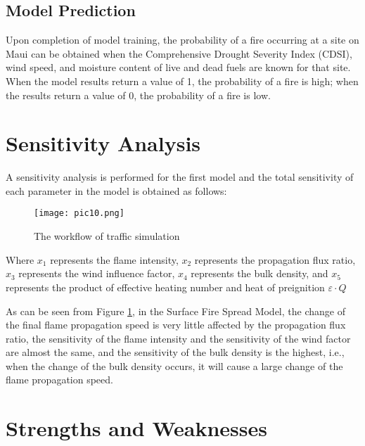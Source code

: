 \documentclass[12pt]{article}  %
\begin{document}
 \vspace{-0.5cm}%
 
 \subsection{Model Prediction}
 Upon completion of model training, the probability of a fire occurring at a site on Maui can be obtained when the Comprehensive Drought Severity Index (CDSI), wind speed, and moisture content of live and dead fuels are known for that site. When the model results return a value of 1, the probability of a fire is high; when the results return a value of 0, the probability of a fire is low. 
 
 \section{Sensitivity Analysis}
 A sensitivity analysis is performed for the first model and the total sensitivity of each parameter in the model is obtained as follows:
 \begin{figure}[H] 
 	\centering 
 	\texttt{[image: pic10.png]} 
 	\caption{The workflow of traffic simulation} 
 	\label{pic11}
 \end{figure}
 Where $x_1$ represents the flame intensity, $x_2$ represents the propagation flux ratio, $x_3$ represents the wind influence factor, $x_4$ represents the bulk density, and $x_5$ represents the product of effective heating number and heat of preignition $\varepsilon \cdot Q$ 
 
 As can be seen from Figure \ref{pic11}, in the Surface Fire Spread Model, the change of the final flame propagation speed is very little affected by the propagation flux ratio, the sensitivity of the flame intensity and the sensitivity of the wind factor are almost the same, and the sensitivity of the bulk density is the highest, i.e., when the change of the bulk density occurs, it will cause a large change of the flame propagation speed.
 
 
 
 
 \section{Strengths and Weaknesses}
\end{document}
